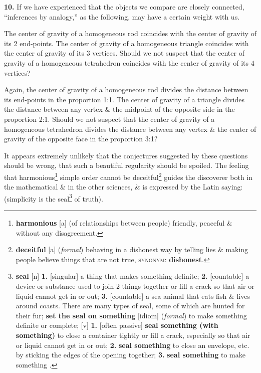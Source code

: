 \documentclass[oneside]{book}
\numberwithin{equation}{section}
\begin{document}
\textbf{10.} If we have experienced that the objects we compare are closely connected, ``inferences by analogy,'' as the following, may have a certain weight with us.

The center of gravity of a homogeneous rod coincides with the center of gravity of its 2 end-points. The center of gravity of a homogeneous triangle coincides with the center of gravity of its 3 vertices. Should we not suspect that the center of gravity of a homogeneous tetrahedron coincides with the center of gravity of its 4 vertices?

Again, the center of gravity of a homogeneous rod divides the distance between its end-points in the proportion 1:1. The center of gravity of a triangle divides the distance between any vertex \& the midpoint of the opposite side in the proportion 2:1. Should we not suspect that the center of gravity of a homogeneous tetrahedron divides the distance between any vertex \& the center of gravity of the opposite face in the proportion 3:1?

It appears extremely unlikely that the conjectures suggested by these questions should be wrong, that such a beautiful regularity should be spoiled. The feeling that harmonious\footnote{\textbf{harmonious} [a] (of relationships between people) friendly, peaceful \& without any disagreement.} simple order cannot be deceitful\footnote{\textbf{deceitful} [a] (\textit{formal}) behaving in a dishonest way by telling lies \& making people believe things that are not true, \textsc{synonym}: \textbf{dishonest}.} guides the discoverer both in the mathematical \& in the other sciences, \& is expressed by the Latin saying:  (simplicity is the seal\footnote{\textbf{seal} [n] \textbf{1.} [singular] a thing that makes something definite; \textbf{2.} [countable] a device or substance used to join 2 things together or fill a crack so that air or liquid cannot get in or out; \textbf{3.} [countable] a sea animal that eats fish \& lives around coasts. There are many types of seal, some of which are hunted for their fur; \textbf{set the seal on something} [idiom] (\textit{formal}) to make something definite or complete; [v] \textbf{1.} [often passive] \textbf{seal something (with something)} to close a container tightly or fill a crack, especially so that air or liquid cannot get in or out; \textbf{2.} \textbf{seal something} to close an envelope, etc. by sticking the edges of the opening together; \textbf{3.} \textbf{seal something} to make something .} of truth).
\end{document}

